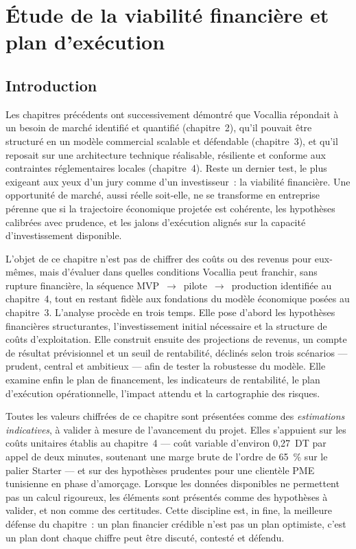 \chapter{Étude de la viabilité financière et plan d'exécution}
\label{Chapitre_5}
\section{Introduction}
\label{sec:intro_chap5}

Les chapitres précédents ont successivement démontré que Vocallia répondait à un besoin de marché identifié et quantifié (chapitre~2), qu'il pouvait être structuré en un modèle commercial scalable et défendable (chapitre~3), et qu'il reposait sur une architecture technique réalisable, résiliente et conforme aux contraintes réglementaires locales (chapitre~4). Reste un dernier test, le plus exigeant aux yeux d'un jury comme d'un investisseur~: la viabilité financière. Une opportunité de marché, aussi réelle soit-elle, ne se transforme en entreprise pérenne que si la trajectoire économique projetée est cohérente, les hypothèses calibrées avec prudence, et les jalons d'exécution alignés sur la capacité d'investissement disponible.

L'objet de ce chapitre n'est pas de chiffrer des coûts ou des revenus pour eux-mêmes, mais d'évaluer dans quelles conditions Vocallia peut franchir, sans rupture financière, la séquence MVP~$\to$~pilote~$\to$~production identifiée au chapitre~4, tout en restant fidèle aux fondations du modèle économique posées au chapitre~3. L'analyse procède en trois temps. Elle pose d'abord les hypothèses financières structurantes, l'investissement initial nécessaire et la structure de coûts d'exploitation. Elle construit ensuite des projections de revenus, un compte de résultat prévisionnel et un seuil de rentabilité, déclinés selon trois scénarios — prudent, central et ambitieux — afin de tester la robustesse du modèle. Elle examine enfin le plan de financement, les indicateurs de rentabilité, le plan d'exécution opérationnelle, l'impact attendu et la cartographie des risques.

Toutes les valeurs chiffrées de ce chapitre sont présentées comme des \emph{estimations indicatives}, à valider à mesure de l'avancement du projet. Elles s'appuient sur les coûts unitaires établis au chapitre~4 — coût variable d'environ 0{,}27~DT par appel de deux minutes, soutenant une marge brute de l'ordre de 65~\% sur le palier Starter — et sur des hypothèses prudentes pour une clientèle PME tunisienne en phase d'amorçage. Lorsque les données disponibles ne permettent pas un calcul rigoureux, les éléments sont présentés comme des hypothèses à valider, et non comme des certitudes. Cette discipline est, in fine, la meilleure défense du chapitre~: un plan financier crédible n'est pas un plan optimiste, c'est un plan dont chaque chiffre peut être discuté, contesté et défendu.

